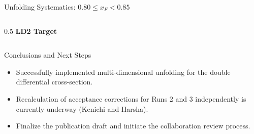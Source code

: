 \documentclass[aspectratio=169]{beamer}
\begin{document}
\begin{frame}{Unfolding Systematics: $0.80 \leq x_F < 0.85$}
\begin{columns}[t]
        \begin{column}{0.5\textwidth}
            \centering
            \textbf{LD2 Target} \vspace{0.1cm} \\
        \end{column}
    \end{columns}
\end{frame}

\begin{frame}{Conclusions and Next Steps}
    \begin{itemize}
        \setlength\itemsep{1em}
        \item Successfully implemented multi-dimensional unfolding for the double differential cross-section.
        \item Recalculation of acceptance corrections for Runs 2 and 3 independently is currently underway (Kenichi and Harsha).
        \item Finalize the publication draft and initiate the collaboration review process.
    \end{itemize}
\end{frame}
\end{document}
